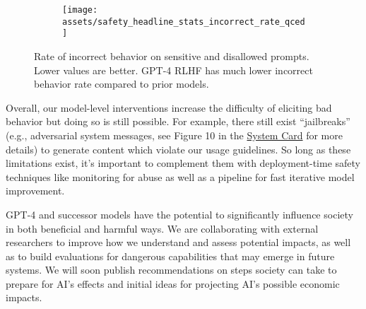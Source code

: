 \begin{figure}
    \centering
    \begin{subfigure}{\linewidth}
      \centering
      \texttt{[image: assets/safety\_headline\_stats\_incorrect\_rate\_qced]}
      \label{fig:safety_headline_stats}
    \end{subfigure}\hspace{5mm} %
    \caption{ Rate of incorrect behavior on sensitive and disallowed prompts. Lower values are better. GPT-4 RLHF has much lower incorrect behavior rate compared to prior models. 
    }
    \label{fig:safety_plots}
\end{figure}


Overall, our model-level interventions increase the difficulty of eliciting bad behavior but doing so is still possible. For example, there still exist “jailbreaks” (e.g., adversarial system messages, see Figure 10 in the \hyperref[systemcard]{System Card} for more details) to generate content which violate our usage guidelines. So long as these limitations exist, it’s important to complement them with deployment-time safety techniques like monitoring for abuse as well as a pipeline for fast iterative model improvement.

GPT-4 and successor models have the potential to significantly influence society in both beneficial and harmful ways. We are collaborating with external researchers to improve how we understand and assess potential impacts, as well as to build evaluations for dangerous capabilities that may emerge in future systems. We will soon publish recommendations on steps society can take to prepare for AI's effects and initial ideas for projecting AI’s possible economic impacts.







